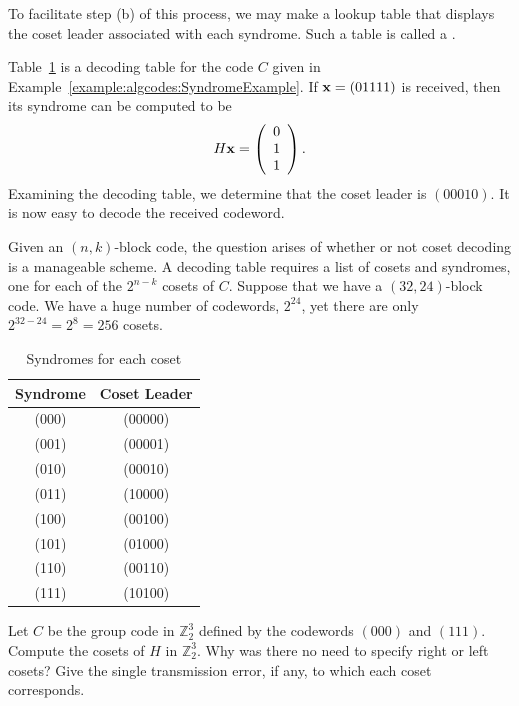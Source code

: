 To facilitate step (b) of this process, we may make a lookup table that displays the coset leader associated
with each syndrome. Such a table is called a . 
 
\begin{example}{}
Table~\ref{table:algcodes:DecodingTable} is a decoding table for the code $C$ given in Example~\ref{example:algcodes:SyndromeExample}. If
${\bold x} = (01111)$ is received, then its syndrome can be computed
to be
\[
H {\bold x} =
\left(
\begin{array}{c}
0 \\
1 \\
1
\end{array}
\right).
\]
Examining the decoding table, we determine that the coset leader is
$(00010)$. It is now easy to decode the received codeword. 
\end{example} 
 
Given an $(n,k)$-block code, the question arises of whether or not
coset decoding is a manageable scheme.  A decoding table requires a
list of cosets and syndromes, one for each of the $2^{n-k}$ cosets of
$C$.  Suppose that we have a $(32, 24)$-block code.  We have a huge
number of codewords, $2^{24}$, yet there are only $2^{32-24} = 2^{8} =
256$ cosets.  
 
\begin{table}[htb]
\caption{Syndromes for each coset \label{table:algcodes:DecodingTable}}{\small
\begin{center}
\begin{tabular}{|c|c|}
\hline
Syndrome & Coset Leader \\
\hline
(000) & (00000) \\
(001) & (00001) \\
(010) & (00010) \\
(011) & (10000) \\
(100) & (00100) \\
(101) & (01000) \\
(110) & (00110) \\
(111) & (10100) \\
\hline
\end{tabular}
\end{center}
}
\end{table}
 
 
\begin{exercise}{}
Let $C$ be the group code in $\mathbb{Z}_2^3$ defined by the codewords
$(000)$ and $(111)$. Compute the cosets of $H$ in $\mathbb{Z}_2^3$. Why
was there no need to specify right or left cosets? Give the
single transmission error, if any, to which each coset corresponds.
 \end{exercise}
 
